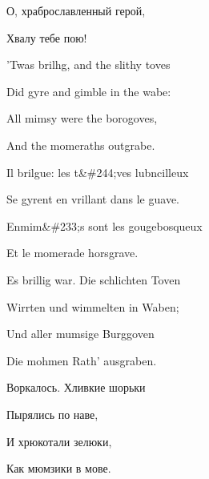 \documentclass[../main.tex]{subfiles}
\begin{document}
О, храброславленный герой,

Хвалу тебе пою!

'Twas brilhg, and the slithy toves

Did gyre and gimble in the wabe:

All mimsy were the borogoves,

And the momeraths outgrabe.

Il brilgue: les t\&\#244;ves lubncilleux

Se gyrent en vrillant dans le guave.

Enmim\&\#233;s sont les gougebosqueux

Et le momerade horsgrave.

Es brillig war. Die schlichten Toven

Wirrten und wimmelten in Waben;

Und aller mumsige Burggoven

Die mohmen Rath' ausgraben.

Воркалось. Хливкие шорьки

Пырялись по наве,

И хрюкотали зелюки,

Как мюмзики в мове.
\end{document}
